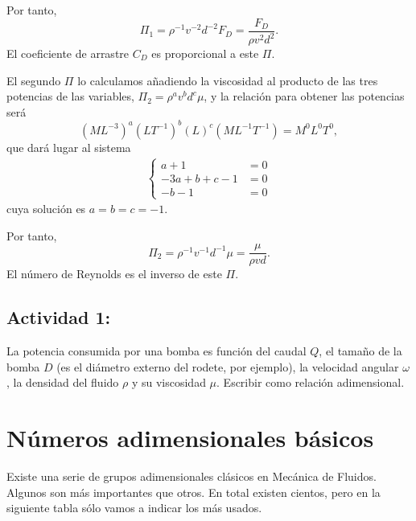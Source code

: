 		Por tanto, 
		\[
		\Pi_{1}=\rho^{-1}v^{-2}d^{-2}F_{D}=\frac{F_{D}}{\rho v^{2}d^{2}}.
		\]
		El coeficiente de arrastre $C_{D}$ es proporcional a este $\Pi$.

		El segundo $\Pi$ lo calculamos añadiendo la viscosidad al producto
		de las tres potencias de las variables, $\Pi_{2}=\rho^{a}v^{b}d^{c}\mu$,
		y la relación para obtener las potencias será 
		\[
		(ML^{-3})^{a}(LT^{-1})^{b}(L)^{c}(ML^{-1}T^{-1})=M^{0}L^{0}T^{0},
		\]
		que dará lugar al sistema 
		\begin{eqnarray*}
			\begin{cases}
				a+1 & =0\\
				-3a+b+c-1 & =0\\
				-b-1 & =0
			\end{cases}
		\end{eqnarray*}
		cuya solución es $a=b=c=-1.$
		
		Por tanto, 
		\[
		\Pi_{2}=\rho^{-1}v^{-1}d^{-1}\mu=\frac{\mu}{\rho vd}.
		\]
		El número de Reynolds es el inverso de este $\Pi$.

	
	\subsection*{Actividad 1:}
		La potencia consumida por una bomba es función del caudal $Q$, el
		tamaño de la bomba $D$ (es el diámetro externo del rodete, por ejemplo),
		la velocidad angular $\omega$, la densidad del fluido $\rho$ y su
		viscosidad $\mu$. Escribir como relación adimensional.
		
\section{Números adimensionales básicos}
	
	
	Existe una serie de grupos adimensionales clásicos en Mecánica de
	Fluidos. Algunos son más importantes que otros. En total existen cientos,
	pero en la siguiente tabla sólo vamos a indicar los más usados.
	
	
	
